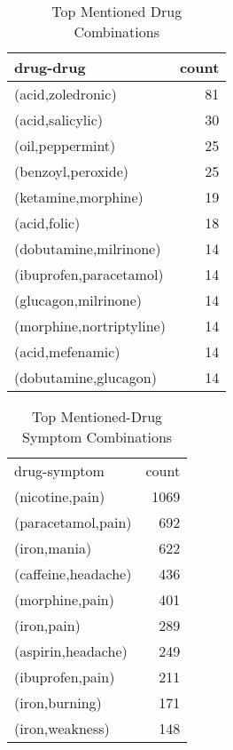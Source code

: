\documentclass[letterpaper]{article}
\begin{document}
\begin{table}
\begin{tabular}{lr}
\hline
drug-drug & count \\
\hline
(acid,zoledronic) & 81\\
(acid,salicylic) & 30\\
(oil,peppermint) & 25\\
(benzoyl,peroxide) & 25\\
(ketamine,morphine) & 19\\
(acid,folic) & 18\\
(dobutamine,milrinone) & 14\\
(ibuprofen,paracetamol) & 14\\
(glucagon,milrinone) & 14\\
(morphine,nortriptyline) & 14\\
(acid,mefenamic) & 14\\
(dobutamine,glucagon) & 14\\
\hline
\end{tabular}
\label{TabcoDrugCount}
\caption{Top Mentioned Drug Combinations}
\end{table}

\begin{table}
\begin{tabular}{lr}
\hline
\hline
drug-symptom & count \\
(nicotine,pain) & 1069\\
(paracetamol,pain) & 692\\
(iron,mania) & 622\\
(caffeine,headache) & 436\\
(morphine,pain) & 401\\
(iron,pain) & 289\\
(aspirin,headache) & 249\\
(ibuprofen,pain) & 211\\
(iron,burning) & 171\\
(iron,weakness) & 148\\
\hline
\end{tabular}
\label{TabcoDrugSymptomCount}
\caption{Top Mentioned-Drug Symptom Combinations}
\end{table}
\end{document}
